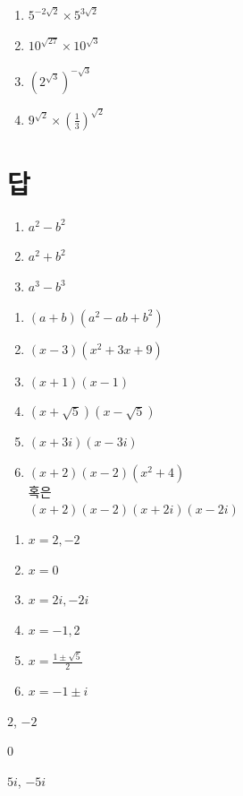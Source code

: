 \documentclass{oblivoir}
\begin{document}
%
\begin{enumerate}\label{real4}
\item
\(5^{-2\sqrt2}\times5^{3\sqrt2}\)
\item
\(10^{\sqrt{27}}\times10^{\sqrt3}\)
\item
\((2^{\sqrt3})^{-\sqrt3}\)
\item
\(\displaystyle9^{\sqrt2}\times\left(\frac13\right)^{\sqrt2}\)
\end{enumerate}

\newpage
\mbox{}
\newpage
\mbox{}
\newpage

%
\section*{답}
\begin{multicols*}{2}
%
\begin{enumerate}
\item
\(a^2-b^2\)
\item
\(a^2+b^2\)
\item
\(a^3-b^3\)
\end{enumerate}

%
\begin{enumerate}
\item
\((a+b)(a^2-ab+b^2)\)
\item
\((x-3)(x^2+3x+9)\)
\item
\((x+1)(x-1)\)
\item
\((x+\sqrt5)(x-\sqrt5)\)
\item
\((x+3i)(x-3i)\)
\item
\((x+2)(x-2)(x^2+4)\)\\
혹은\\
\((x+2)(x-2)(x+2i)(x-2i)\)
\end{enumerate}

%
\begin{enumerate}
\item
\(x=2,-2\)
\item
\(x=0\)
\item
\(x=2i,-2i\)
\item
\(x=-1,2\)
\item
\(x=\frac{1\pm\sqrt5}2\)
\item
\(x=-1\pm i\)
\end{enumerate}

%
\begin{enumerate*}[itemjoin=\hspace{.05\textwidth}]
\item
\(2\), \(-2\)
\item
\(0\)
\item
\(5i\), \(-5i\)
\end{enumerate*}



\end{multicols*}
\end{document}
